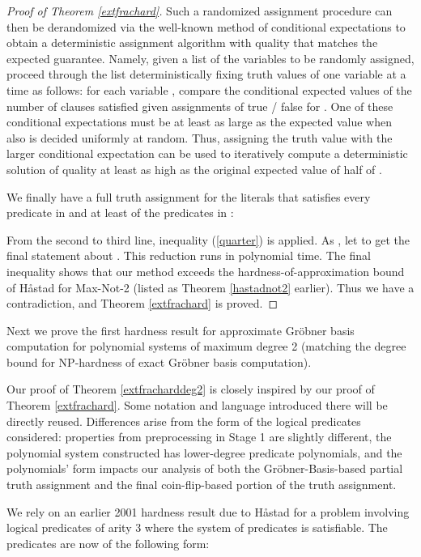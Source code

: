 \documentclass{article}
\begin{document}
\begin{proof}[Proof of Theorem \ref{extfrachard}]
Such a randomized assignment procedure can then be derandomized via the well-known method of conditional expectations to obtain a deterministic assignment algorithm with quality that matches the expected guarantee.
Namely, given a list of the variables  to be randomly assigned, proceed through the list deterministically fixing truth values of one variable at a time as follows: for each variable , compare the conditional expected values of the number of clauses satisfied given assignments of true / false for . One of these conditional expectations must be at least as large as the expected value when  also is decided uniformly at random.  Thus, assigning  the truth value with the larger conditional expectation can be used to iteratively compute a deterministic solution of quality at least as high as the original expected value of half of .

We finally have a full truth assignment for the literals  that satisfies every predicate in  and at least  of the predicates in :



From the second to third line, inequality (\ref{quarter}) is applied. As , let  to get the final statement about . This reduction runs in polynomial time. The
final inequality shows that our method exceeds the hardness-of-approximation bound of H{\aa}stad for Max-Not-2 (listed as Theorem \ref{hastadnot2} earlier). Thus we have a contradiction, and Theorem \ref{extfrachard} is proved.
\end{proof}

Next we prove the first hardness result for approximate Gr\"{o}bner basis computation for polynomial systems of maximum degree 2 (matching the degree bound for NP-hardness of exact Gr\"{o}bner basis computation).  



Our proof of Theorem \ref{extfracharddeg2} is closely inspired by our proof of Theorem \ref{extfrachard}. Some notation and language introduced there will be directly reused. Differences arise from the form of the logical predicates considered: properties from preprocessing in Stage 1 are slightly different, the polynomial system constructed has lower-degree predicate polynomials, and the polynomials' form impacts our analysis of both the Gr\"{o}bner-Basis-based partial truth assignment and the final coin-flip-based portion of the truth assignment.

We rely on an earlier 2001 hardness result due to H{\aa}stad for a problem involving logical predicates of arity 3 where the system of predicates is satisfiable.  The predicates are now of the following form:
\end{document}
